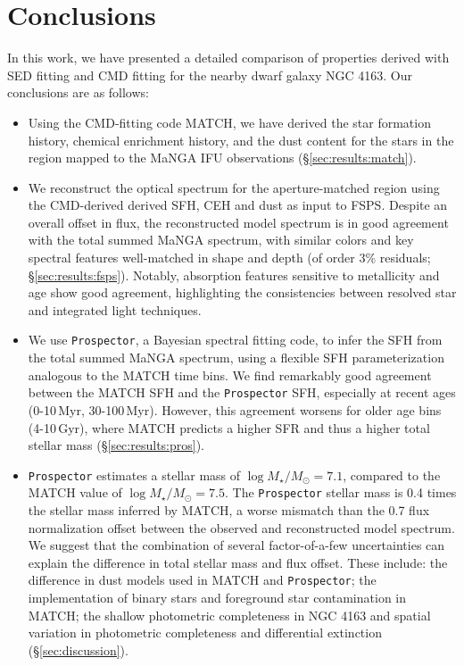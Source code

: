 \documentclass[preprint2]{aastex62}
\newcommand{\Myr}{$\,$Myr\xspace}
\newcommand{\Gyr}{$\,$Gyr\xspace}
\begin{document}
\section{Conclusions}\label{sec:conclusions}

In this work, we have presented a detailed comparison of properties derived with SED fitting and CMD fitting for the nearby dwarf galaxy NGC 4163. Our conclusions are as follows:

\begin{itemize}
    \item Using the CMD-fitting code MATCH, we have derived the star formation history, chemical enrichment history, and the dust content for the stars in the region mapped to the MaNGA IFU observations (\S\ref{sec:results:match}).
    \item We reconstruct the optical spectrum for the aperture-matched region using the CMD-derived derived SFH, CEH and dust as input to FSPS. Despite an overall offset in flux, the reconstructed model spectrum is in good agreement with the total summed MaNGA spectrum, with similar colors and key spectral features well-matched in shape and depth (of order 3\% residuals; \S\ref{sec:results:fsps}). Notably, absorption features sensitive to metallicity and age show good agreement, highlighting the consistencies between resolved star and integrated light techniques.
    \item We use {\tt Prospector}, a Bayesian spectral fitting code, to infer the SFH from the total summed MaNGA spectrum, using a flexible SFH parameterization analogous to the MATCH time bins. We find remarkably good agreement between the MATCH SFH and the {\tt Prospector} SFH, especially at recent ages (0-10\Myr, 30-100\Myr). However, this agreement worsens for older age bins (4-10\Gyr), where MATCH predicts a higher SFR and thus a higher total stellar mass (\S\ref{sec:results:pros}).
    \item {\tt Prospector} estimates a stellar mass of $\log{M_\star/M_\odot} = 7.1$, compared to the MATCH value of $\log{M_\star/M_\odot} = 7.5$. The {\tt Prospector} stellar mass is 0.4 times the stellar mass inferred by MATCH, a worse mismatch than the 0.7 flux normalization offset between the observed and reconstructed model spectrum. We suggest that the combination of several factor-of-a-few uncertainties can explain the difference in total stellar mass and flux offset. These include: the difference in dust models used in MATCH and {\tt Prospector}; the implementation of binary stars and foreground star contamination in MATCH; the shallow photometric completeness in NGC 4163 and spatial variation in photometric completeness and differential extinction (\S\ref{sec:discussion}). 
\end{itemize}
\end{document}
